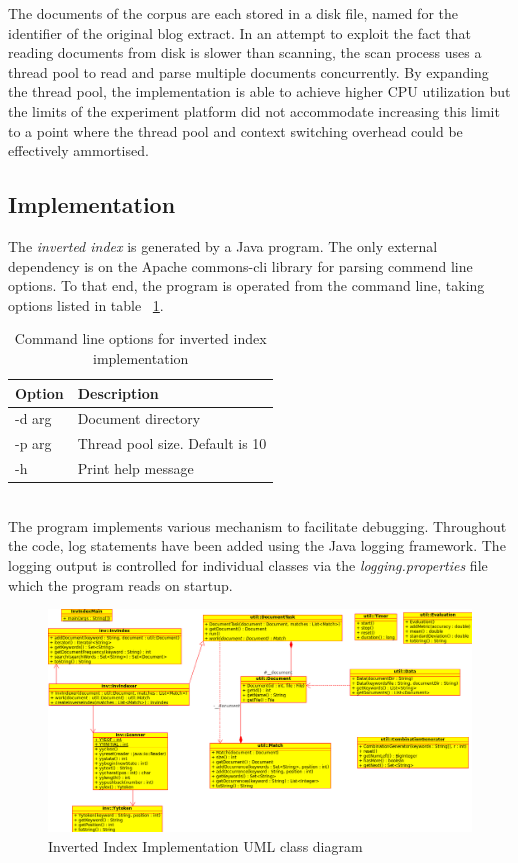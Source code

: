 \documentclass[10pt]{report}
\begin{document}
The documents of the corpus are each stored in a disk file, named for
the identifier of the original blog extract. In an attempt to exploit
the fact that reading documents from disk is slower than
scanning, the scan process uses a thread pool to read
and parse multiple documents concurrently. By expanding the thread
pool, the implementation is able to achieve higher CPU utilization but
the limits of the experiment platform did not accommodate increasing
this limit to a point where the thread pool and context switching
overhead could be effectively ammortised.


\subsection*{Implementation}
The \textit{inverted index} is generated by a Java
program. The only external dependency is on the Apache commons-cli
library for parsing commend line options. To that end, the program is
operated from the command line, taking options listed in table
~\ref{tab:invcommandline}.  
\\
\begin{table}[h]
  \centering
  \begin{tabular}{ |l|p{10cm}|} 
    \hline
    Option & Description \\ \hline
    -d \<arg\>  &  Document directory \\ \hline
    -p \<arg\>  &  Thread pool size. Default is 10 \\ \hline
    -h          &  Print help message \\ \hline
  \end{tabular}
  \caption{Command line options for inverted index implementation}
  \label{tab:invcommandline}
\end{table}
\\

The program implements various mechanism to facilitate
debugging. Throughout the code, log statements have been added using
the Java logging framework. The logging output is controlled for
individual classes via the \textit{logging.properties} file which the
program reads on startup.

\begin{figure}
  \begin{center}
	\includegraphics[angle=90,width=!,height=0.90\textheight]{invuml}
  \end{center}
  \caption{Inverted Index Implementation UML class diagram}
  \label{fig:invuml}
\end{figure} 
\end{document}
